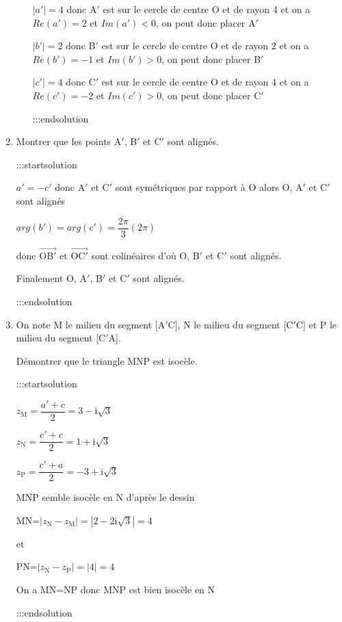 \documentclass{cornouaille}
\begin{document}
\begin{enumerate}
\begin{enumerate}
$|a'|=4$ donc A$'$ est sur le cercle de centre O et de rayon 4 et on a $Re\left(a' \right) =2$ et $Im\left(a' \right)<0$, on peut donc placer A$'$


$|b'|=2$ donc B$'$ est sur le cercle de centre O et de rayon 2 et on a $Re\left(b' \right) =-1$ et $Im\left(b' \right)>0$, on peut donc placer B$'$


$|c'|=4$ donc C$'$ est sur le cercle de centre O et de rayon 4 et on a $Re\left(c' \right) =-2$ et $Im\left(c' \right)>0$, on peut donc placer C$'$



:::endsolution

\end{enumerate}

\item  Montrer que les points A$'$, B$'$ et C$'$ sont alignés.


:::startsolution


$a'=-c'$ donc A$'$ et C$'$ sont symétriques par rapport à O alors O, A$'$ et C$'$ sont alignés

$arg\left( b'\right) =arg\left( c'\right) =\dfrac{2\pi}{3} (2\pi)$

donc $\overrightarrow{\text{OB}'}$ et $\overrightarrow{\text{OC}'}$ sont colinéaires d'où O, B$'$ et C$'$ sont alignés.

Finalement O, A$'$, B$'$ et C$'$ sont alignés.


:::endsolution

\item  On note M le milieu du segment [A$'$C], N le milieu du segment [C$'$C] et P le milieu du
segment [C$'$A].

Démontrer que le triangle MNP est isocèle.


:::startsolution


$z_{\text{M}}=\dfrac{a'+c}{2}=3-\text{i}\sqrt{3}$

$z_{\text{N}}=\dfrac{c'+c}{2}=1+\text{i}\sqrt{3}$

$z_{\text{P}}=\dfrac{c'+a}{2}=-3+\text{i}\sqrt{3}$

MNP semble isocèle en N d'après le dessin

MN=$\left|z_{\text{N}}-z_{\text{M}} \right| = \left|2-2\text{i}\sqrt{3} \right| =4$

et

PN=$\left|z_{\text{N}}-z_{\text{P}} \right| =\left|4 \right| = 4$

On a MN=NP donc MNP est bien isocèle en N


:::endsolution
\end{enumerate}
\end{document}
